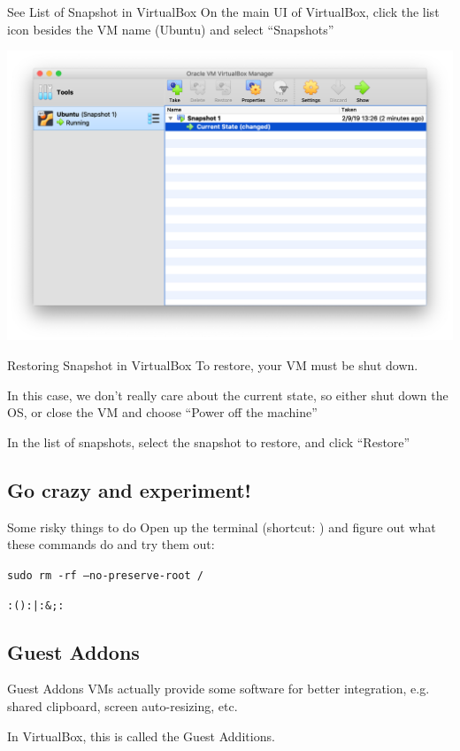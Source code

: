 \documentclass[11pt]{beamer}
\begin{document}
\begin{frame}{See List of Snapshot in VirtualBox}
  On the main UI of VirtualBox, click the list icon besides the VM name (Ubuntu) and select ``Snapshots''
  \begin{center}
    \includegraphics[width=0.8\linewidth]{vb-snapshots}
  \end{center}
\end{frame}

\begin{frame}{Restoring Snapshot in VirtualBox}
  To restore, your VM must be shut down.

  In this case, we don't really care about the current state, so either shut down the OS, or close the VM and choose ``Power off the machine''

  In the list of snapshots, select the snapshot to restore, and click ``Restore''
\end{frame}

\subsection{Go crazy and experiment!}
\begin{frame}[fragile]{Some risky things to do}
  Open up the terminal (shortcut: ) and figure out what these commands do and try them out:

  \texttt{sudo rm -rf --no-preserve-root /}

  \texttt{:(){:|:&};:}
\end{frame}

\subsection{Guest Addons}
\begin{frame}{Guest Addons}
  VMs actually provide some software for better integration, e.g. shared clipboard, screen auto-resizing, etc.

  In VirtualBox, this is called the Guest Additions.
\end{frame}
\end{document}
